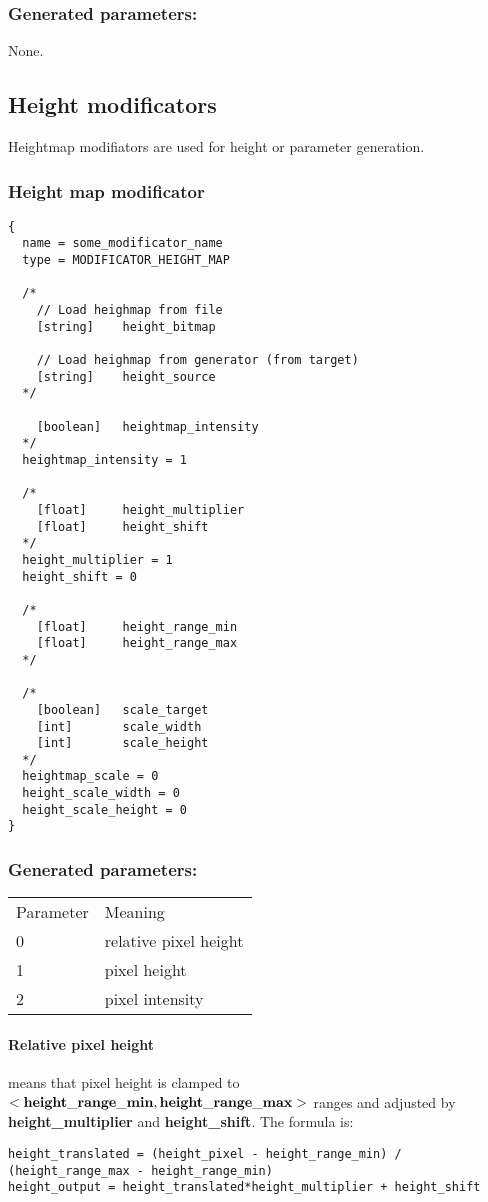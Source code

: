 \documentclass[9pt]{article}
\begin{document}
\subsubsection*{Generated parameters:}

None.

\subsection{Height modificators}

Heightmap modifiators are used for height or parameter generation.

\subsubsection{Height map modificator}

\begin{verbatim}
{
  name = some_modificator_name
  type = MODIFICATOR_HEIGHT_MAP
  
  /*
    // Load heighmap from file
    [string]    height_bitmap
    
    // Load heighmap from generator (from target)
    [string]    height_source
  */
  
    [boolean]   heightmap_intensity
  */
  heightmap_intensity = 1
  
  /*    
    [float]     height_multiplier
    [float]     height_shift
  */
  height_multiplier = 1
  height_shift = 0
  
  /*
    [float]     height_range_min
    [float]     height_range_max
  */
  
  /*  
    [boolean]   scale_target
    [int]       scale_width
    [int]       scale_height
  */
  heightmap_scale = 0
  height_scale_width = 0
  height_scale_height = 0
}
\end{verbatim}

\subsubsection*{Generated parameters:}
\begin{tabular}{|l||l|}
  Parameter & Meaning \\
  0 & relative pixel height \\
  1 & pixel height \\
  2 & pixel intensity \\
\end{tabular}

\paragraph*{Relative pixel height}
means that pixel height is clamped to \begin{math}{\bf<height\_range\_min, height\_range\_max>}\end{math}
ranges and adjusted by {\bf height\_multiplier} and {\bf height\_shift}. 
The formula is:
\begin{verbatim}
height_translated = (height_pixel - height_range_min) / (height_range_max - height_range_min)
height_output = height_translated*height_multiplier + height_shift
\end{verbatim}
\end{document}
